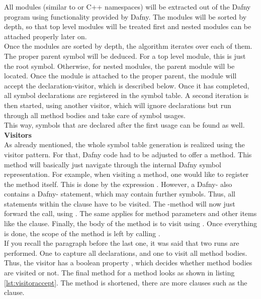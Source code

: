 All modules (similar to \CsharpWithSpace or C++ namespaces) will be extracted out of the Dafny program using functionality provided by Dafny.
The modules will be sorted by depth, so that top level modules will be treated first and nested modules can be attached properly later on.\\

Once the modules are sorted by depth, the algorithm iterates over each of them.
The proper parent symbol will be deduced.
For a top level module, this is just the root symbol.
Otherwise, for nested modules, the parent module will be located.
Once the module is attached to the proper parent, the module will accept the declaration-visitor, which is described below.
Once it has completed, all symbol declarations are registered in the symbol table.
A second iteration is then started, using another visitor, which will ignore declarations but run through all method bodies
and take care of symbol usages.\\
This way, symbols that are declared after the first usage can be found as well.\\

\textbf{Visitors}\\
As already mentioned, the whole symbol table generation is realized using the visitor pattern. 
For that, Dafny code had to be adjusted to offer a  method.
This method will basically just navigate through the internal Dafny symbol representation.
For example, when visiting a method, one would like to register the method itself.
This is done by the expression .
However, a Dafny- also contains a Dafny- statement, which may contain further symbols.
Thus, all statements within the  clause have to be visited.
The -method will now just forward the call, using .
The same applies for method parameters and other items like the  clause.
Finally, the body of the method is to visit using .
Once everything is done, the scope of the method is left by calling .\\

If you recall the paragraph before the last one, it was said that two runs are performed.
One to capture all declarations, and one to visit all method bodies.
Thus, the visitor has a boolean property , which decides whether method bodies are visited or not.
The final  method for a method looks as shown in listing \ref{lst:visitoraccept}.
The method is shortened, there are more clauses such as the  clause.


